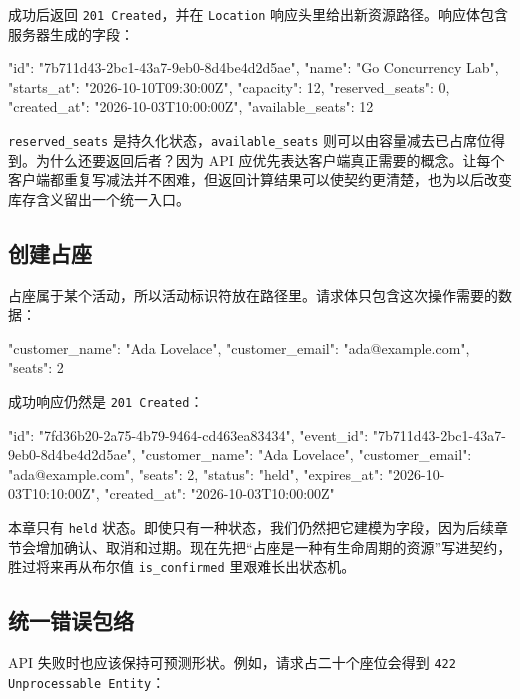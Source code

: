 成功后返回 \texttt{201 Created}，并在 \texttt{Location} 响应头里给出新资源路径。响应体包含服务器生成的字段：

\begin{jsoncode}[title={代码清单 12.2 创建活动的 JSON 响应}]
{
  "id": "7b711d43-2bc1-43a7-9eb0-8d4be4d2d5ae",
  "name": "Go Concurrency Lab",
  "starts_at": "2026-10-10T09:30:00Z",
  "capacity": 12,
  "reserved_seats": 0,
  "created_at": "2026-10-03T10:00:00Z",
  "available_seats": 12
}
\end{jsoncode}

\texttt{reserved\_seats} 是持久化状态，\texttt{available\_seats} 则可以由容量减去已占席位得到。为什么还要返回后者？因为 API 应优先表达客户端真正需要的概念。让每个客户端都重复写减法并不困难，但返回计算结果可以使契约更清楚，也为以后改变库存含义留出一个统一入口。

\subsection{创建占座}

占座属于某个活动，所以活动标识符放在路径里。请求体只包含这次操作需要的数据：

\begin{jsoncode}[title={代码清单 12.3 创建占座的 JSON 请求}]
{
  "customer_name": "Ada Lovelace",
  "customer_email": "ada@example.com",
  "seats": 2
}
\end{jsoncode}

成功响应仍然是 \texttt{201 Created}：

\begin{jsoncode}[title={代码清单 12.4 占座响应}]
{
  "id": "7fd36b20-2a75-4b79-9464-cd463ea83434",
  "event_id": "7b711d43-2bc1-43a7-9eb0-8d4be4d2d5ae",
  "customer_name": "Ada Lovelace",
  "customer_email": "ada@example.com",
  "seats": 2,
  "status": "held",
  "expires_at": "2026-10-03T10:10:00Z",
  "created_at": "2026-10-03T10:00:00Z"
}
\end{jsoncode}

本章只有 \texttt{held} 状态。即使只有一种状态，我们仍然把它建模为字段，因为后续章节会增加确认、取消和过期。现在先把“占座是一种有生命周期的资源”写进契约，胜过将来再从布尔值 \texttt{is\_confirmed} 里艰难长出状态机。

\subsection{统一错误包络}

API 失败时也应该保持可预测形状。例如，请求占二十个座位会得到 \texttt{422 Unprocessable Entity}：


